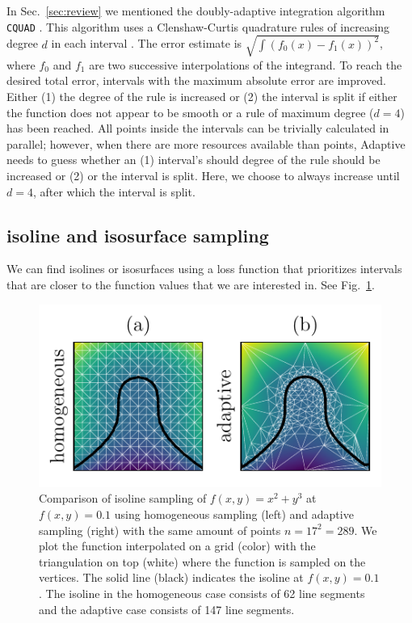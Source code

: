\documentclass[english, twocolumn, 10pt, aps, superscriptaddress, floatfix, prb, citeautoscript]{revtex4-1}
\renewcommand{\citep}{\cite}
\newcommand{\passthrough}[1]{\lstset{mathescape=false}#1\lstset{mathescape=true}}
\begin{document}
In Sec.~\ref{sec:review} we mentioned the doubly-adaptive integration algorithm \passthrough{\lstinline!CQUAD!} \citep{Gonnet2010}.
This algorithm uses a Clenshaw-Curtis quadrature rules of increasing degree \(d\) in each interval \citep{Clenshaw1960}.
The error estimate is \(\sqrt{\int{\left(f_0(x) - f_1(x)\right)^2}}\), where \(f_0\) and \(f_1\) are two successive interpolations of the integrand.
To reach the desired total error, intervals with the maximum absolute error are improved.
Either (1) the degree of the rule is increased or (2) the interval is split if either the function does not appear to be smooth or a rule of maximum degree (\(d=4\)) has been reached.
All points inside the intervals can be trivially calculated in parallel; however, when there are more resources available than points, Adaptive needs to guess whether an (1) interval's should degree of the rule should be increased or (2) or the interval is split.
Here, we choose to always increase until \(d=4\), after which the interval is split.

\subsection{isoline and isosurface sampling}

We can find isolines or isosurfaces using a loss function that prioritizes intervals that are closer to the function values that we are interested in.
See Fig.~\ref{fig:isoline}.

\begin{figure}
\centering
\includegraphics{figures/isoline.pdf}
\caption{Comparison of isoline sampling of \(f(x,y)=x^2 + y^3\) at \(f(x,y)=0.1\) using homogeneous sampling (left) and adaptive sampling (right) with the same amount of points \(n=17^2=289\).
We plot the function interpolated on a grid (color) with the triangulation on top (white) where the function is sampled on the vertices.
The solid line (black) indicates the isoline at \(f(x,y)=0.1\).
The isoline in the homogeneous case consists of 62 line segments and the adaptive case consists of 147 line segments.\label{fig:isoline}}
\end{figure}
\end{document}
